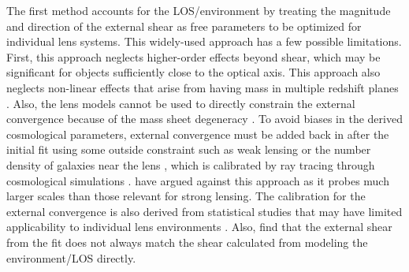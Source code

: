 The first method accounts for the LOS/environment by treating the magnitude and direction of the external shear as free parameters to be optimized for individual lens systems. This widely-used approach has a few possible limitations. First, this approach neglects higher-order effects beyond shear, which may be significant for objects sufficiently close to the optical axis. This approach also neglects non-linear effects that arise from having mass in multiple redshift planes \citep[][]{McCully14,Jaroszynski12}. Also, the lens models cannot be used to directly constrain the external convergence because of the mass sheet degeneracy \citep{Falco85}.  To avoid biases in the derived cosmological parameters, external convergence must be added back in after the initial fit using some outside constraint such as weak lensing \citep{Nakajima09, Fadely10} or the number density of galaxies near the lens \citep{Suyu10, Suyu13, Collett13}, which is calibrated by ray tracing through cosmological simulations \citep[e.g.,][]{Hilbert09}. \citet{Schneider13} have argued against this approach as it probes much larger scales than those relevant for strong lensing. The calibration for the external convergence is also derived from statistical studies that may have limited applicability to individual lens environments \citep{Wong11}. Also, \citet{Wong11} find that the external shear from the fit does not always match the shear calculated from modeling the environment/LOS directly.
  
  